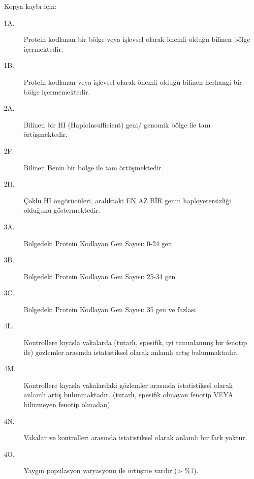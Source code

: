 \documentclass{article}
\begin{document}
Kopya kaybı için:
\begin{description}
	\item[1A.] Protein kodlanan bir bölge veya işlevsel olarak önemli olduğu bilinen bölge içermektedir.
	\item[1B.] Protein kodlanan veya işlevsel olarak önemli olduğu bilinen herhangi bir bölge içermemektedir.
	\item[2A.] Bilinen bir HI (Haploinsufficient) geni/ genomik bölge ile tam örtüşmektedir. 
	\item[2F.] Bilinen Benin bir bölge ile tam örtüşmektedir.
	\item[2H.] Çoklu HI öngörücüleri, aralıktaki EN AZ BİR genin haployetersizliği olduğunu göstermektedir.
	\item[3A.] Bölgedeki Protein Kodlayan Gen Sayısı: 0-24 gen
	\item[3B.] Bölgedeki Protein Kodlayan Gen Sayısı: 25-34 gen
	\item[3C.] Bölgedeki Protein Kodlayan Gen Sayısı: 35 gen ve fazlası
	\item[4L.] Kontrollere kıyasla vakalarda (tutarlı, spesifik, iyi tanımlanmış bir fenotip ile) gözlemler arasında istatistiksel olarak anlamlı artış bulunmaktadır.
	\item[4M.] Kontrollere kıyasla vakalardaki gözlemler arasında istatistiksel olarak anlamlı artış bulunmaktadır. (tutarlı, spesifik olmayan fenotip VEYA bilinmeyen fenotip olmadan)
	\item[4N.] Vakalar ve kontrolleri arasında istatistiksel olarak anlamlı bir fark yoktur.
	\item[4O.] Yaygın popülasyon varyasyonu ile örtüşme vardır (> \%1). 
\end{description}
\end{document}
